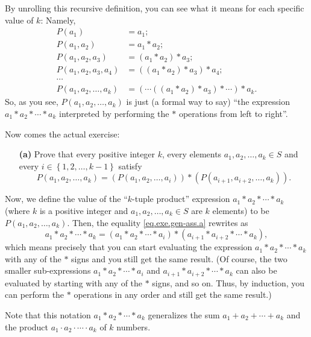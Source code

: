 \documentclass[paper=a4, fontsize=12pt]{scrartcl} %
\newcommand{\set}[1]{\left\{ #1 \right\}}
\newcommand{\tup}[1]{\left( #1 \right)}
\theoremstyle{plainsl}
\theoremstyle{definition}
\theoremstyle{remark}
\begin{document}
By unrolling this recursive definition, you can see what it
means for each specific value of $k$: Namely,
\begin{align*}
P \tup{a_1} &= a_1 ; \\
P \tup{a_1, a_2} &= a_1 * a_2 ; \\
P \tup{a_1, a_2, a_3} &= \tup{a_1 * a_2} * a_3 ; \\
P \tup{a_1, a_2, a_3, a_4} &= \tup{\tup{a_1 * a_2} * a_3} * a_4 ; \\
\cdots \\
P \tup{a_1, a_2, \ldots, a_k} &= \tup{ \cdots \tup{\tup{a_1 * a_2} * a_3} * \cdots } * a_k .
\end{align*}
So, as you see, $P \tup{a_1, a_2, \ldots, a_k}$ is just
(a formal way to say) ``the expression
$a_1 * a_2 * \cdots * a_k$ interpreted by performing
the $*$ operations from left to right''.

Now comes the actual exercise:

\begin{enumerate}

\item[\textbf{(a)}]
Prove that
every positive integer $k$, every elements
$a_1, a_2, \ldots, a_k \in S$
and every $i \in \set{1, 2, \ldots, k-1}$ satisfy
\begin{equation}
P \tup{a_1, a_2, \ldots, a_k}
= \tup{P \tup{a_1, a_2, \ldots, a_i}}
     * \tup{P \tup{a_{i+1}, a_{i+2}, \ldots, a_k}} .
\label{eq.exe.gen-ass.a}
\end{equation}

\end{enumerate}

Now, we define the value
of the ``$k$-tuple product'' expression
$a_1 * a_2 * \cdots * a_k$ (where $k$ is a positive
integer and $a_1, a_2, \ldots, a_k \in S$ are $k$
elements) to be $P \tup{a_1, a_2, \ldots, a_k}$.
Then, the equality \eqref{eq.exe.gen-ass.a} rewrites as
\[
a_1 * a_2 * \cdots * a_k
= \tup{a_1 * a_2 * \cdots * a_i}
    * \tup{a_{i+1} * a_{i+2} * \cdots * a_k} ,
\]
which means precisely that you can start evaluating
the expression $a_1 * a_2 * \cdots * a_k$ with any
of the $*$ signs and you still get the same result.
(Of course, the two smaller sub-expressions
$a_1 * a_2 * \cdots * a_i$ and
$a_{i+1} * a_{i+2} * \cdots * a_k$ can also be
evaluated by starting with any of the $*$ signs,
and so on.
Thus, by induction, you can perform the $*$ operations
in any order and still get the same result.)

Note that this notation $a_1 * a_2 * \cdots * a_k$
generalizes the sum $a_1 + a_2 + \cdots + a_k$ and the
product $a_1 \cdot a_2 \cdot \cdots \cdot a_k$ of $k$
numbers.
\end{document}
